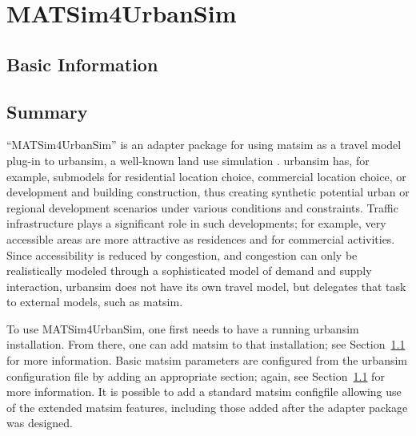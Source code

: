 \section{MATSim4UrbanSim}
\label{sec:matsim4urbansim}


\subsection{Basic Information}
\label{sec:matsim4urbansim-stdInfo}


\subsection{Summary}
``MATSim4UrbanSim'' is an adapter package for using \gls{matsim} as a travel model plug-in to \gls{urbansim}, a well-known land use simulation \citep[e.g.][see \url{http://www.urbansim.org}]{WaddellEtc2003UrbanSim}.
\gls{urbansim} has, for example, submodels for residential location choice, commercial location choice, or development and building construction, thus creating synthetic  potential urban or regional development scenarios under various conditions and constraints. 
Traffic infrastructure plays a significant role in such developments; for example, very accessible areas are more attractive as residences and for commercial activities. 
Since accessibility is reduced by congestion, and congestion can only be realistically modeled through a sophisticated model of demand and supply interaction, \gls{urbansim} does not have its own travel model, but delegates that task to external models, such as \gls{matsim}.

To use MATSim4UrbanSim, one first needs to have a running \gls{urbansim} installation. 
From there, one can add \gls{matsim} to that installation; see Section~\ref{sec:matsim4urbansim-stdInfo} for more information. 
Basic \gls{matsim} parameters are configured from the \gls{urbansim} configuration file by adding an appropriate section; again, see Section~\ref{sec:matsim4urbansim-stdInfo} for more information. 
It is possible to add a standard \gls{matsim} \gls{configfile} allowing use of the extended \gls{matsim} features, including those added after the adapter package was designed.

